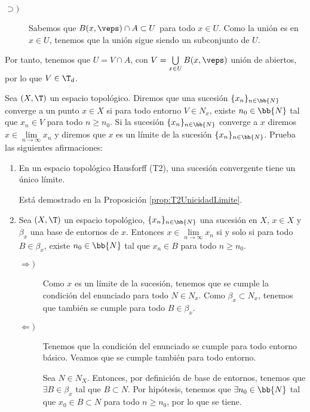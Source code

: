 \begin{ejercicio}
\begin{enumerate}
\begin{description}
\begin{description}
                \item[$\supset)$] Sabemos que $B(x,\veps)\cap A\subset U$ para todo $x\in U$. Como la unión es en $x\in U$, tenemos que la unión sigue siendo un subconjunto de $U$.
            \end{description}

            Por tanto, tenemos que $U=V\cap A$, con $V=\bigcup\limits_{x\in U}B(x,\veps)$ unión de abiertos, por lo que $V\in \T_d$.
        \end{description}
    \end{enumerate}
\end{ejercicio}

\begin{ejercicio}
    Sea $(X,\T)$ un espacio topológico. Diremos que una sucesión $\{x_n\}_{n\in \bb{N}}$ converge a un punto $x\in X$ si para todo entorno $V\in {N}_x$, existe $n_0\in \bb{N}$ tal que $x_n\in V$ para todo $n\geq n_0$. Si la sucesión $\{x_n\}_{n\in \bb{N}}$ converge a $x$ diremos $x\in \lim\limits_{n\to \infty} x_n$ y diremos que $x$ es un límite de la sucesión $\{x_n\}_{n\in \bb{N}}$. Prueba las siguientes afirmaciones:
    \begin{enumerate}[label=\alph*)]
        \item En un espacio topológico Hausforff (T2), una sucesión convergente tiene un único límite.

        Está demostrado en la Proposición \ref{prop:T2UnicidadLimite}.

        \item Sea $(X, \T)$ un espacio topológico, $\{x_n\}_{n\in \bb{N}}$ una sucesión en $X$, $x\in X$ y $\beta_x$ una base de entornos de $x$. Entonces $x\in \lim\limits_{n\to \infty}x_n$ si y solo si para todo $B\in \beta_x$, existe $n_0\in \bb{N}$ tal que $x_n\in B$ para todo $n\geq n_0$.

        \begin{description}
            \item[$\Longrightarrow)$]
                Como $x$ es un límite de la sucesión, tenemos que se cumple la condición del enunciado para todo $N\in N_x$. Como $\beta_x\subset N_x$, tenemos que también se cumple para todo $B\in \beta_x$.
                
            \item[$\Longleftarrow)$]
                Tenemos que la condición del enunciado se cumple para todo entorno básico. Veamos que se cumple también para todo entorno.

                Sea $N\in N_X$. Entonces, por definición de base de entornos, tenemos que $\exists B\in \beta_x$ tal que $B\subset N$. Por hipótesis, tenemos que $\exists n_0\in \bb{N}$ tal que $x_0\in B\subset N$ para todo $n\geq n_0$, por lo que se tiene.
        \end{description}   


\end{enumerate}
\end{ejercicio}
